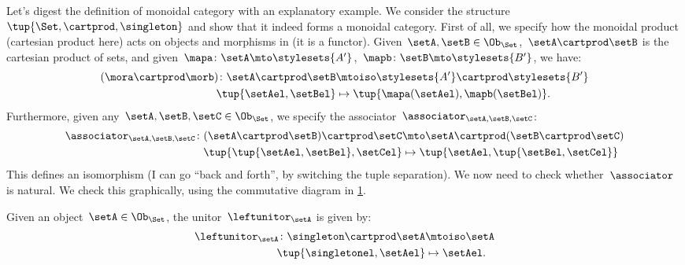 \begin{example}
    Let's digest the definition of monoidal category with an explanatory example.
    We consider the structure~$\tup{\Set,\cartprod,\singleton}$ and show that it indeed forms a monoidal category.
    First of all, we specify how the monoidal product (cartesian product here) acts on objects and morphisms in \Set (it is a functor).
    Given~$\setA,\setB\in \Ob_{\Set}$,~$\setA\cartprod \setB$ is the cartesian product of sets, and given~$\mapa\colon \setA\mto \stylesets{A'}$,~$\mapb\colon \setB\mto \stylesets{B'}$, we have:
    \begin{equation*}
        \label{eq:set_mon_prod_2}
        \begin{aligned}
            (\mora \cartprod \morb)
            \colon \setA\cartprod \setB & \mtoiso \stylesets{A'}\cartprod \stylesets{B'} \\
            \tup{\setAel,\setBel}       & \mapsto \tup{\mapa(\setAel),\mapb(\setBel)}.
        \end{aligned}
    \end{equation*}
    Furthermore, given any~$\setA,\setB,\setC\in \Ob_{\Set}$, we specify the associator~$\associator_{\setA,\setB,\setC}$:
    \begin{equation*}
        \label{eq:set_mon_prod_3}
        \begin{aligned}
            \associator_{\setA,\setB,\setC}\colon (\setA\cartprod \setB)\cartprod \setC & \mto \setA\cartprod (\setB\cartprod \setC) \\
            \tup{\tup{\setAel,\setBel},\setCel}                                         & \mapsto \tup{\setAel,\tup{\setBel,\setCel}}
        \end{aligned}
    \end{equation*}
    This defines an isomorphism (I can go ``back and forth'', by switching the tuple separation).
    We now need to check whether~$\associator$ is natural.
    We check this graphically, using the commutative diagram in \cref{fig:monoidal_set_ass_nat}.

    \begin{figure}[h!]
        \centering
        \caption{}
        \label{fig:monoidal_set_ass_nat}
    \end{figure}

    Given an object~$\setA\in \Ob_\Set$, the unitor~$\leftunitor_\setA$ is given by:
    \begin{equation*}
        \label{eq:set_mon_prod_4}
        \begin{aligned}
            \leftunitor_\setA\colon \singleton \cartprod \setA & \mtoiso \setA \\
            \tup{\singletonel,\setAel}                         & \mapsto \setAel.
        \end{aligned}
    \end{equation*}


\end{example}
